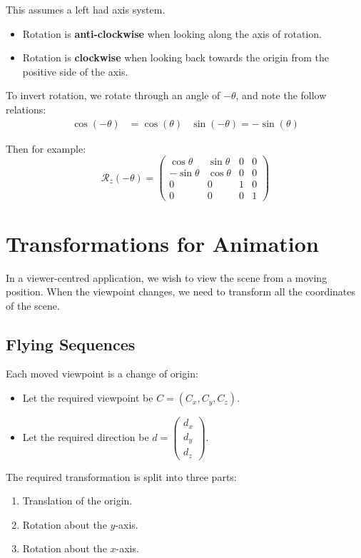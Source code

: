 \documentclass[11pt]{article}
\begin{document}
This assumes a left had axis system.
\begin{itemize}
  \item Rotation is \textbf{anti-clockwise} when looking along the axis of rotation.
  \item Rotation is \textbf{clockwise} when looking back towards the origin from the positive side of the axis.
\end{itemize}

To invert rotation, we rotate through an angle of $- \theta$, and note the follow relations:
\begin{align*}
  \cos(-\theta) &= \cos(\theta) & \sin(-\theta)=-\sin(\theta)
\end{align*}

Then for example:
\[
  \mathcal{R}_z(-\theta) = 
  \begin{pmatrix}
    \cos \theta & \sin \theta & 0 & 0 \\
    - \sin \theta & \cos \theta & 0 & 0 \\
    0 & 0 & 1 & 0 \\
    0 & 0 & 0 & 1
  \end{pmatrix}
\]

\section{Transformations for Animation}
In a viewer-centred application, we wish to view the scene from a moving position.
When the viewpoint changes, we need to transform all the coordinates of the scene.

\subsection{Flying Sequences}
Each moved viewpoint is a change of origin:
\begin{itemize}
  \item Let the required viewpoint be $C = (C_x, C_y, C_z)$.
  \item Let the required direction be $d = \begin{pmatrix} d_x \\ d_y \\ d_z \end{pmatrix}$.
\end{itemize}

The required transformation is split into three parts:
\begin{enumerate}
  \item Translation of the origin.
  \item Rotation about the $y$-axis.
  \item Rotation about the $x$-axis.
\end{enumerate}
\end{document}
